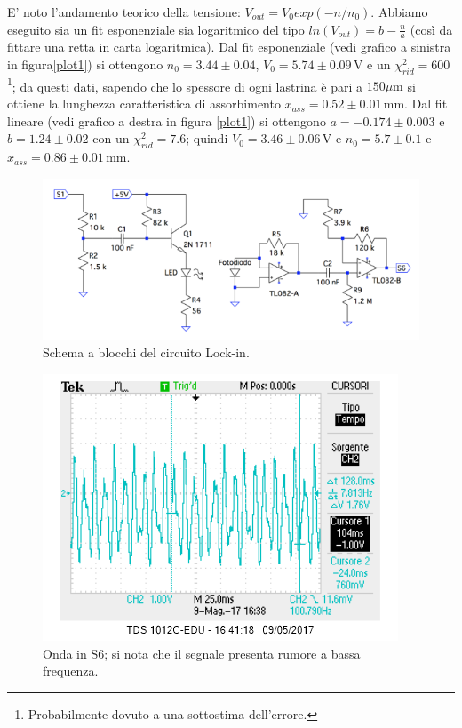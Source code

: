 \documentclass[10pt,a4paper]{article}
\begin{document}
E' noto l'andamento teorico della tensione: $V_{out}=V_0 exp(-n/n_0)$. Abbiamo eseguito sia un fit esponenziale  sia logaritmico del tipo $ln(V_{out})=b-\frac{n}{a}$ (così da fittare una retta in carta logaritmica). Dal fit esponenziale (vedi grafico a sinistra in figura\ref{plot1}) si ottengono $n_0=3.44\pm0.04$, $V_0=5.74\pm0.09\,\mbox{V}$ e un $\chi^2 _{rid}=600$\footnote{Probabilmente dovuto a una sottostima dell'errore.}; da questi dati, sapendo che lo spessore di ogni lastrina è pari a $150\mu \mbox{m}$ si ottiene la lunghezza caratteristica di assorbimento $x_{ass}=0.52\pm0.01\,\mbox{mm}$. Dal fit lineare (vedi grafico a destra in figura \ref{plot1}) si ottengono $a=-0.174\pm0.003$ e $b=1.24\pm0.02$ con un $\chi^2_{rid}=7.6$; quindi $V_0= 3.46\pm0.06\,\mbox{V}$ e $n_0=5.7\pm0.1$ e $x_{ass}=0.86\pm0.01\,\mbox{mm}$.


\begin{figure}[!htb]
  \centering
  \includegraphics[scale=0.75]{ampli-preampli.png}
\caption{Schema a blocchi del circuito Lock-in.\label{fig:ampli-preampli}}
\end{figure}

\begin{figure}[!htb]
  \centering
  \includegraphics[scale=0.75]{S6.png}
\caption{Onda in S6; si nota che il segnale presenta rumore a bassa frequenza.\label{osc:S6}}
\end{figure}
\end{document}
